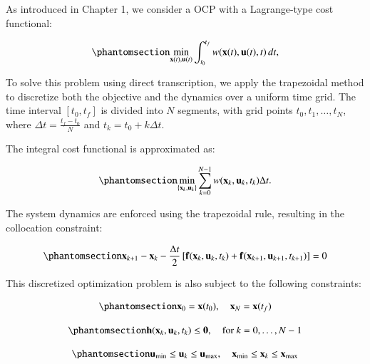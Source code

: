 \documentclass[
  number,
  preprint]{elsarticle}
\begin{document}
As introduced in Chapter 1, we consider a OCP with a Lagrange-type cost
functional:

\begin{equation}\protect\phantomsection\label{eq-ch2-continuous-cost}{
\min_{\mathbf{x}(t), \mathbf{u}(t)} \int_{t_0}^{t_f} w(\mathbf{x}(t), \mathbf{u}(t), t) \, dt,
}\end{equation}

To solve this problem using direct transcription, we apply the
trapezoidal method to discretize both the objective and the dynamics
over a uniform time grid. The time interval \([t_0, t_f]\) is divided
into \(N\) segments, with grid points \(t_0, t_1, \ldots, t_N\), where
\(\Delta t = \frac{t_f - t_0}{N}\) and \(t_k = t_0 + k \Delta t\).

The integral cost functional is approximated as:

\begin{equation}\protect\phantomsection\label{eq-ch2-discrete-cost}{
\min_{\{\mathbf{x}_k, \mathbf{u}_k\}} \sum_{k=0}^{N-1} w(\mathbf{x}_k, \mathbf{u}_k, t_k) \Delta t.
}\end{equation}

The system dynamics are enforced using the trapezoidal rule, resulting
in the collocation constraint:

\begin{equation}\protect\phantomsection\label{eq-ch2-dyn-constraint}{
\mathbf{x}_{k+1} - \mathbf{x}_k - \frac{\Delta t}{2} \left[ \mathbf{f}(\mathbf{x}_k, \mathbf{u}_k, t_k) + \mathbf{f}(\mathbf{x}_{k+1}, \mathbf{u}_{k+1}, t_{k+1}) \right] = 0
}\end{equation}

This discretized optimization problem is also subject to the following
constraints:

\begin{equation}\protect\phantomsection\label{eq-ch2-boundary-conditions}{
\mathbf{x}_0 = \mathbf{x}(t_0), \quad \mathbf{x}_N = \mathbf{x}(t_f)
}\end{equation}

\begin{equation}\protect\phantomsection\label{eq-ch2-path-constraints}{
\mathbf{h}(\mathbf{x}_k, \mathbf{u}_k, t_k) \leq \mathbf{0}, \quad \text{for } k = 0, \dots, N-1
}\end{equation}

\begin{equation}\protect\phantomsection\label{eq-ch2-bounds}{
\mathbf{u}_{\min} \leq \mathbf{u}_k \leq \mathbf{u}_{\max}, \quad \mathbf{x}_{\min} \leq \mathbf{x}_k \leq \mathbf{x}_{\max}
}\end{equation}
\end{document}
